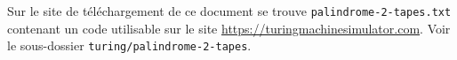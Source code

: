 Sur le site de téléchargement de ce document se trouve \verb+palindrome-2-tapes.txt+ contenant un code utilisable sur le site \url{https://turingmachinesimulator.com}. Voir le sous-dossier \verb+turing/palindrome-2-tapes+.